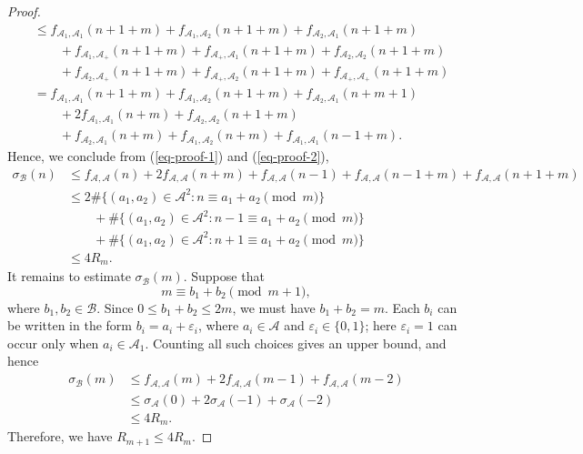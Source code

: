 \documentclass[12pt,a4paper,reqno]{amsart}
\numberwithin{equation}{section}
\theoremstyle{plain}
\theoremstyle{definition}
\begin{document}
\begin{proof}
\begin{align}
    &\le f_{\mathcal{A}_{1},\mathcal{A}_{1}}(n+1+m)+f_{\mathcal{A}_{1},\mathcal{A}_{2}}(n+1+m)
    +f_{\mathcal{A}_{2},\mathcal{A}_{1}}(n+1+m)\nonumber\\
    &\quad \quad +f_{\mathcal{A}_{1},\mathcal{A}_{+}}(n+1+m)+f_{\mathcal{A}_{+},\mathcal{A}_{1}}(n+1+m)+f_{\mathcal{A}_{2},\mathcal{A}_{2}}(n+1+m)\nonumber\\
    &\quad \quad +f_{\mathcal{A}_{2},\mathcal{A}_{+}}(n+1+m)+f_{\mathcal{A}_{+},\mathcal{A}_{2}}(n+1+m)+f_{\mathcal{A}_{+},\mathcal{A}_{+}}(n+1+m)\nonumber\\
    &= f_{\mathcal{A}_{1},\mathcal{A}_{1}}(n+1+m)+f_{\mathcal{A}_{1},\mathcal{A}_{2}}(n+1+m)
    +f_{\mathcal{A}_{2},\mathcal{A}_{1}}(n+m+1)\nonumber\\
    &\quad \quad +2f_{\mathcal{A}_{1},\mathcal{A}_{1}}(n+m)+f_{\mathcal{A}_{2},\mathcal{A}_{2}}(n+1+m)\nonumber\\
    &\quad \quad +f_{\mathcal{A}_{2},\mathcal{A}_{1}}(n+m)+f_{\mathcal{A}_{1},\mathcal{A}_{2}}(n+m)+f_{\mathcal{A}_{1},\mathcal{A}_{1}}(n-1+m).
\end{align}
Hence, we conclude from (\ref{eq-proof-1}) and (\ref{eq-proof-2}),
\begin{align}\label{eq-proof-3}
    \sigma_{\mathcal{B}}(n)&\le f_{\mathcal{A},\mathcal{A}}(n)+2f_{\mathcal{A},\mathcal{A}}(n+m)+f_{\mathcal{A},\mathcal{A}}(n-1)+f_{\mathcal{A},\mathcal{A}}(n-1+m)+f_{\mathcal{A},\mathcal{A}}(n+1+m)\nonumber\\
    &\le 2\#\big\{(a_1,a_2)\in \mathcal{A}^2: n\equiv a_1+a_2 \pmod{m}\big\}\nonumber\\
    &\quad \quad +\#\big\{(a_1,a_2)\in \mathcal{A}^2: n-1\equiv a_1+a_2\pmod{m}\big\}\nonumber\\
    &\quad \quad +\#\big\{(a_1,a_2)\in \mathcal{A}^2: n+1\equiv a_1+a_2\pmod{m}\big\}\nonumber\\
    &\le 4R_m.
\end{align}
It remains to estimate $\sigma_{\mathcal B}(m)$. Suppose that
$$
m\equiv b_1+b_2\pmod{m+1},
$$
where $b_1,b_2\in\mathcal B$. Since $0\le b_1+b_2\le 2m$, we must have $b_1+b_2=m$. Each $b_i$ can be written in the form $b_i=a_i+\varepsilon_i$, where $a_i\in\mathcal A$ and $\varepsilon_i\in\{0,1\}$; here $\varepsilon_i=1$ can occur only when $a_i\in\mathcal A_1$. Counting all such choices gives an upper bound, and hence
\begin{align*}
\sigma_{\mathcal B}(m)
&\le f_{\mathcal A,\mathcal A}(m)+2f_{\mathcal A,\mathcal A}(m-1)+f_{\mathcal A,\mathcal A}(m-2)\\
&\le \sigma_{\mathcal A}(0)+2\sigma_{\mathcal A}(-1)+\sigma_{\mathcal A}(-2)\\
&\le 4R_m.
\end{align*}
Therefore, we have $R_{m+1}\le 4 R_m$.


\end{proof}
\end{document}
